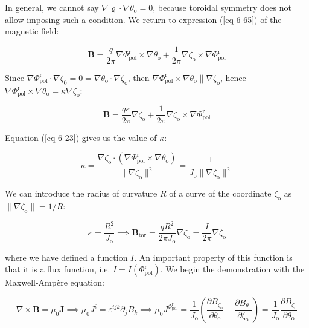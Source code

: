 \quad In general, we cannot say $\nabla\varrho\cdot\nabla\theta_\text{o}=0$, because toroidal symmetry does not allow imposing such a condition. We return to expression (\ref{eq-6-65}) of the magnetic field:

\begin{equation}
    \label{eq-6-70}
    \mathbf{B}=\frac{q}{2\pi}\nabla\Phi_\text{pol}^\text{r}\times\nabla\theta_\text{o}+\frac{1}{2\pi}\nabla\zeta_\text{o}\times\nabla\Phi_\text{pol}^\text{r}
\end{equation}

Since $\nabla\Phi_\text{pol}^\text{r}\cdot\nabla\zeta_0=0=\nabla\theta_\text{o}\cdot\nabla\zeta_\text{o}$, then $\nabla\Phi_\text{pol}^\text{r}\times\nabla\theta_\text{o}\parallel\nabla\zeta_\text{o}$, hence $\nabla\Phi_\text{pol}^\text{r}\times\nabla\theta_\text{o}=\kappa\nabla\zeta_\text{o}$:

\begin{equation}
    \mathbf{B}=\frac{q\kappa}{2\pi}\nabla\zeta_\text{o}+\frac{1}{2\pi}\nabla\zeta_\text{o}\times\nabla\Phi_\text{pol}^\text{r}
\end{equation}

Equation (\ref{eq-6-23}) gives us the value of $\kappa$:

\begin{equation}
    \kappa=\frac{\nabla\zeta_\text{o}\cdot(\nabla\Phi_\text{pol}^\text{r}\times\nabla\theta_\text{o})}{\|\nabla\zeta_\text{o}\|^2}=\frac{1}{J_\text{o}\|\nabla\zeta_\text{o}\|^2}
\end{equation}

We can introduce the radius of curvature $R$ of a curve of the coordinate $\zeta_\text{o}$ as $\|\nabla\zeta_\text{o}\|=1/R$:

\begin{equation}
    \kappa=\frac{R^2}{J_\text{o}}\implies\mathbf{B}_\text{tor}=\frac{qR^2}{2\pi J_\text{o}}\nabla\zeta_\text{o}=\frac{I}{2\pi}\nabla\zeta_\text{o}
\end{equation}

where we have defined a function $I$. An important property of this function is that it is a flux function, i.e. $I=I(\Phi_\text{pol}^\text{r})$. We begin the demonstration with the Maxwell-Ampère equation:

\begin{equation}
    \nabla\times\mathbf{B}=\mu_0\mathbf{J}\implies \mu_0J^i=\varepsilon^{ijk}\partial_jB_k\implies\mu_0J^{\Phi_\text{pol}^\text{r}}=\frac{1}{J_\text{o}}\left(\frac{\partial B_{\zeta_\text{o}}}{\partial\theta_\text{o}}-\frac{\partial B_{\theta_\text{o}}}{\partial\zeta_\text{o}}\right)=\frac{1}{J_\text{o}}\frac{\partial B_{\zeta_\text{o}}}{\partial\theta_\text{o}}
\end{equation}

